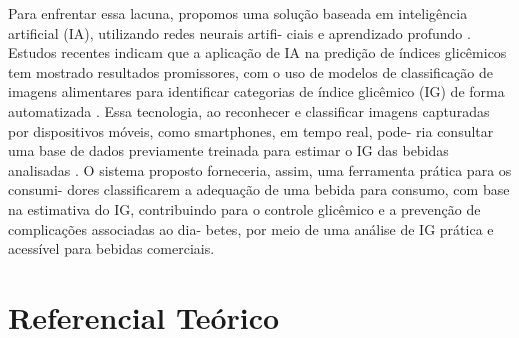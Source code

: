 \documentclass[conference]{IEEEtran}
\begin{document}
Para enfrentar essa lacuna, propomos uma solução baseada 
em inteligência artificial (IA), utilizando redes neurais artifi-
ciais e aprendizado profundo \cite{b16}. Estudos recentes indicam 
que a aplicação de IA na predição de índices glicêmicos tem 
mostrado resultados promissores, com o uso de modelos de 
classificação de imagens alimentares para identificar categorias 
de índice glicêmico (IG) de forma automatizada \cite{b9}. Essa 
tecnologia, ao reconhecer e classificar imagens capturadas por 
dispositivos móveis, como smartphones, em tempo real, pode-
ria consultar uma base de dados previamente treinada para 
estimar o IG das bebidas analisadas \cite{b17}. O sistema proposto 
forneceria, assim, uma ferramenta prática para os consumi-
dores classificarem a adequação de uma bebida para consumo, 
com base na estimativa do IG, contribuindo para o controle 
glicêmico e a prevenção de complicações associadas ao dia-
betes, por meio de uma análise de IG prática e acessível para 
bebidas comerciais.
\fussy

\section{Referencial Teórico}
\end{document}
